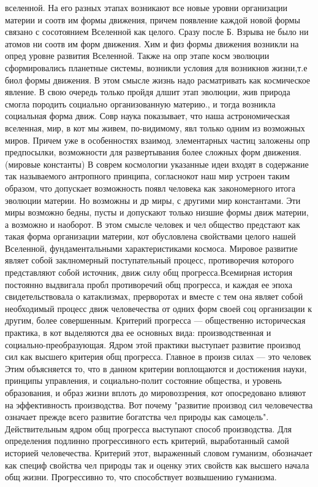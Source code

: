 \documentclass[12pt]{article}
\begin{document}
вселенной.  На  его  разных  этапах  возникают  все  новые  уровни  организации  материи  и  соотв  им  формы
движения, причем появление каждой новой формы связано с сосотоянием Вселенной как целого. Сразу после Б.
Взрыва не было ни атомов ни соотв им форм движения. Хим и физ формы движения возникли на опред уровне
развития  Вселенной.  Также  на  опр  этапе  косм  эволюции  сформировались  планетные  системы,  возникли
условия  для  возникнов  жизни,т.е  биол  формы  движения.  В  этом  смысле  жизнь  надо  расматривать  как
космическое явление. В свою очередь только пройдя длшит этап эволюции, жив природа смогла породить
социально организованную материю., и тогда возникла социальная форма движ.
Совр наука показывает, что наша астрономическая вселенная, мир, в кот мы живем, по-видимому, явл только
одним  из  возможных  миров.  Причем  уже  в  особенностях  взаимод.  элементарных  частиц  заложены  опр
предпосылки, возможности для развертывания более сложных форм движения. (мировые константы)
В соврем космологии указанные идеи входят в содержание так называемого антропного принципа, согласнокот
наш мир устроен таким образом, что допускает возможность появл человека как закономерного итога эволюции
материи. Но возможны и др миры, с другими мир константами. Эти миры возможно бедны, пусты и допускают
только низшие формы движ материи, а возможно и наоборот. В этом смысле человек и чел общество предстают
как  такая  форма  организации  материи,  кот  обусловлена  свойствами  целого  нашей  Вселенной,
фундаментальными характеристиками космоса. 
Мировое развитие являет собой заклномерный поступательный процесс, противоречия которого представляют
собой источник, движ силу общ прогресса.Всемирная история постоянно выдвигала пробл противоречий общ
прогресса, и каждая ее эпоха свидетельствовала о катаклизмах, прерворотах и вместе с тем она являет собой
необходимый процесс движ человечества от одних форм своей соц организации к другим, более совершенным. 
Критерий  прогресса --- общественно  историческая  практика,  в  кот  выделяются  два  ее  основных  вида:
производственная и социально-преобразующая. Ядром этой практики выступает развитие производ сил как
высшего критерия общ прогресса. Главное в произв силах --- это человек Этим объясняется то, что в данном
критерии воплощаются и достижения науки, принципы управления, и социально-полит состояние общества, и
уровень образования, и образ жизни вплоть до мировоззрения, кот опосредовано влияют на эффективность
производства. Вот почему "развитие производ сил человечества означает прежде всего развитие богатства чел
природы как самоцель". Действительным ядром общ прогресса выступают способ производства.
Для  определения  подлинно  прогрессивного  есть  критерий,  выработанный  самой  историей  человечества.
Критерий этот, выраженный словом гуманизм, обозначает как специф свойства чел природы так и оценку этих
свойств как высшего начала общ жизни. Прогрессивно то, что способствует возвышению гуманизма.
\end{document}
